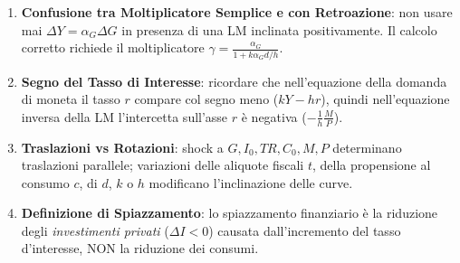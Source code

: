 \begin{esame}
\begin{enumerate}
    \item \textbf{Confusione tra Moltiplicatore Semplice e con Retroazione}: non usare mai $\Delta Y = \alpha_G \Delta G$ in presenza di una LM inclinata positivamente. Il calcolo corretto richiede il moltiplicatore $\gamma = \frac{\alpha_G}{1 + k \alpha_G d / h}$.
    \item \textbf{Segno del Tasso di Interesse}: ricordare che nell'equazione della domanda di moneta il tasso $r$ compare col segno meno ($kY - hr$), quindi nell'equazione inversa della LM l'intercetta sull'asse $r$ è negativa ($-\frac{1}{h}\frac{M}{P}$).
    \item \textbf{Traslazioni vs Rotazioni}: shock a $G, I_0, TR, C_0, M, P$ determinano traslazioni parallele; variazioni delle aliquote fiscali $t$, della propensione al consumo $c$, di $d$, $k$ o $h$ modificano l'inclinazione delle curve.
    \item \textbf{Definizione di Spiazzamento}: lo spiazzamento finanziario è la riduzione degli \textit{investimenti privati} ($\Delta I < 0$) causata dall'incremento del tasso d'interesse, NON la riduzione dei consumi.
\end{enumerate}
\end{esame}
